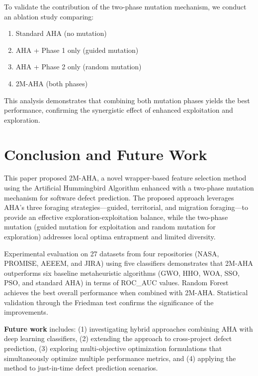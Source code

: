 \documentclass[conference,twocolumn]{IEEEtran}
\begin{document}
To validate the contribution of the two-phase mutation mechanism, we conduct an ablation study comparing:
\begin{enumerate}
    \item Standard AHA (no mutation)
    \item AHA + Phase 1 only (guided mutation)
    \item AHA + Phase 2 only (random mutation)
    \item 2M-AHA (both phases)
\end{enumerate}

This analysis demonstrates that combining both mutation phases yields the best performance, confirming the synergistic effect of enhanced exploitation and exploration.

\section{Conclusion and Future Work}\label{sec:conclusion}

This paper proposed 2M-AHA, a novel wrapper-based feature selection method using the Artificial Hummingbird Algorithm enhanced with a two-phase mutation mechanism for software defect prediction. The proposed approach leverages AHA's three foraging strategies---guided, territorial, and migration foraging---to provide an effective exploration-exploitation balance, while the two-phase mutation (guided mutation for exploitation and random mutation for exploration) addresses local optima entrapment and limited diversity.

Experimental evaluation on 27 datasets from four repositories (NASA, PROMISE, AEEEM, and JIRA) using five classifiers demonstrates that 2M-AHA outperforms six baseline metaheuristic algorithms (GWO, HHO, WOA, SSO, PSO, and standard AHA) in terms of ROC\_AUC values. Random Forest achieves the best overall performance when combined with 2M-AHA. Statistical validation through the Friedman test confirms the significance of the improvements.

\textbf{Future work} includes: (1) investigating hybrid approaches combining AHA with deep learning classifiers, (2) extending the approach to cross-project defect prediction, (3) exploring multi-objective optimization formulations that simultaneously optimize multiple performance metrics, and (4) applying the method to just-in-time defect prediction scenarios.
\end{document}
